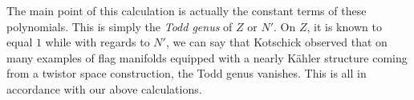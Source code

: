 \documentclass{scrartcl}
\begin{document}
The main point of this calculation is actually the constant terms of these polynomials. This is simply the \emph{Todd genus} of $Z$ or $N'$. On $Z$, it is known to equal $1$ while with regards to $N'$, we can say that Kotschick observed that on many examples of flag manifolds equipped with a nearly K\"{a}hler structure coming from a twistor space construction, the Todd genus vanishes. This is all in accordance with our above calculations.
\end{document}
